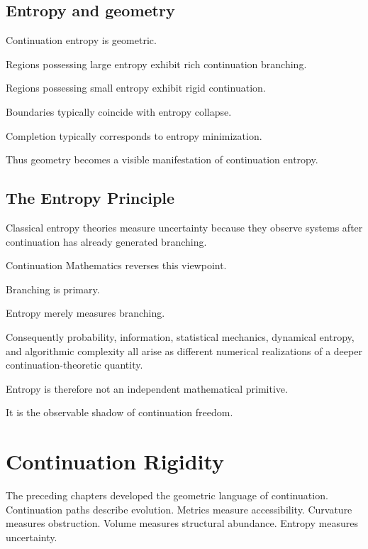 \documentclass[13pt,openany]{book}
\theoremstyle{plain}
\theoremstyle{definition}
\begin{document}
\section{Entropy and geometry}

Continuation entropy is geometric.

Regions possessing large entropy exhibit rich continuation branching.

Regions possessing small entropy exhibit rigid continuation.

Boundaries typically coincide with entropy collapse.

Completion typically corresponds to entropy minimization.

Thus geometry becomes a visible manifestation of continuation entropy.

\section{The Entropy Principle}

Classical entropy theories measure uncertainty because they observe systems after continuation has already generated branching.

Continuation Mathematics reverses this viewpoint.

Branching is primary.

Entropy merely measures branching.

Consequently probability, information, statistical mechanics, dynamical entropy, and algorithmic complexity all arise as different numerical realizations of a deeper continuation-theoretic quantity.

Entropy is therefore not an independent mathematical primitive.

It is the observable shadow of continuation freedom.

\chapter{Continuation Rigidity}

The preceding chapters developed the geometric language of continuation.
Continuation paths describe evolution.
Metrics measure accessibility.
Curvature measures obstruction.
Volume measures structural abundance.
Entropy measures uncertainty.
\end{document}
